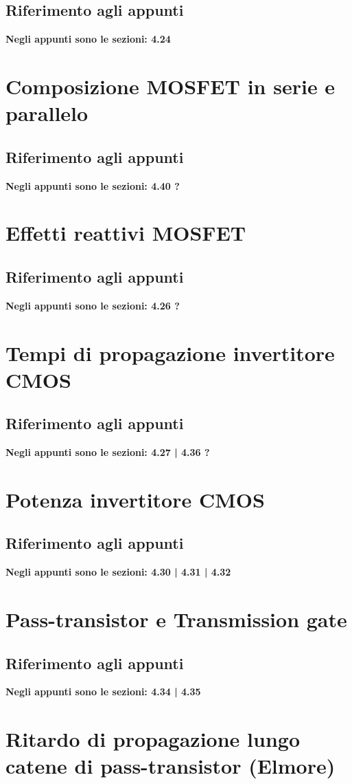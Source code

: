\documentclass{article}
\numberwithin{equation}{subsection}
\begin{document}
	\subsection{Riferimento agli appunti}
	\textbf{Negli appunti sono le sezioni: 4.24}
	\section{Composizione MOSFET in serie e parallelo}
	\subsection{Riferimento agli appunti}
	\textbf{Negli appunti sono le sezioni: 4.40 ?}
	\section{Effetti reattivi MOSFET}
	\subsection{Riferimento agli appunti}
	\textbf{Negli appunti sono le sezioni: 4.26 ?}
	\section{Tempi di propagazione invertitore CMOS}
	\subsection{Riferimento agli appunti}
	\textbf{Negli appunti sono le sezioni: 4.27 | 4.36 ?}
	\section{Potenza invertitore CMOS}
	\subsection{Riferimento agli appunti}
	\textbf{Negli appunti sono le sezioni: 4.30 | 4.31 | 4.32}
	\section{Pass-transistor e Transmission gate}
	\subsection{Riferimento agli appunti}
	\textbf{Negli appunti sono le sezioni: 4.34 | 4.35}
	\section{Ritardo di propagazione lungo catene di pass-transistor (Elmore)}
\end{document}
